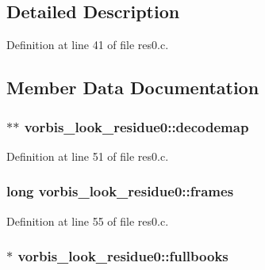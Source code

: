 \subsection{Detailed Description}


Definition at line 41 of file res0.\+c.



\subsection{Member Data Documentation}
\subsubsection[{\texorpdfstring{decodemap}{decodemap}}]{$\ast$$\ast$ vorbis\+\_\+look\+\_\+residue0\+::decodemap}\hypertarget{structvorbis__look__residue0_a34284cd770760f95da4b2d98461682a8}{}\label{structvorbis__look__residue0_a34284cd770760f95da4b2d98461682a8}


Definition at line 51 of file res0.\+c.

\subsubsection[{\texorpdfstring{frames}{frames}}]{\setlength{\rightskip}{0pt plus 5cm}long vorbis\+\_\+look\+\_\+residue0\+::frames}\hypertarget{structvorbis__look__residue0_ae8bde7a200dd22172436657d943713f6}{}\label{structvorbis__look__residue0_ae8bde7a200dd22172436657d943713f6}


Definition at line 55 of file res0.\+c.

\subsubsection[{\texorpdfstring{fullbooks}{fullbooks}}]{$\ast$ vorbis\+\_\+look\+\_\+residue0\+::fullbooks}\hypertarget{structvorbis__look__residue0_a1d93ad3c66a4321afca88cb39586cd5e}{}\label{structvorbis__look__residue0_a1d93ad3c66a4321afca88cb39586cd5e}


